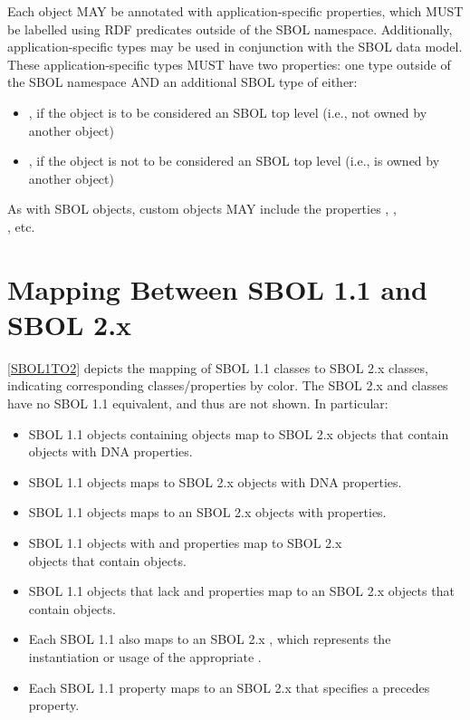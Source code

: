 Each  object MAY be annotated with application-specific properties, which MUST be labelled using RDF predicates outside of the SBOL namespace.  Additionally, application-specific types may be used in conjunction with the SBOL data model. These application-specific types MUST have two  properties: one type outside of the SBOL namespace AND an additional SBOL type of either:

\begin{itemize}
  \item {}, if the object is to be considered an SBOL top level (i.e., not owned by another object)
  \item {}, if the object is not to be considered an SBOL top level (i.e., is owned by another object)
\end{itemize}

As with SBOL  objects, custom  objects MAY include the properties , ,\\ , etc. 

\section{Mapping Between SBOL 1.1 and SBOL 2.x}
\label{sec:mapping}

\ref{SBOL1TO2} depicts the mapping of SBOL 1.1 classes to SBOL 2.x classes, indicating corresponding classes/properties by color.
The SBOL 2.x  and  classes have no SBOL 1.1 equivalent, and thus are not shown.
In particular:
\begin{itemize}
\item SBOL 1.1  objects containing  objects map to SBOL 2.x  objects that contain  objects with DNA  properties.
\item SBOL 1.1  objects maps to SBOL 2.x  objects with DNA  properties.
\item SBOL 1.1  objects maps to an SBOL 2.x  objects with   properties.
\item SBOL 1.1  objects with  and  properties map to SBOL 2.x\\
 objects that contain  objects.
\item SBOL 1.1  objects that lack  and  properties map to an SBOL 2.x  objects that contain  objects.
\item Each SBOL 1.1  also maps to an SBOL 2.x , which represents the instantiation or usage of the appropriate .
\item Each SBOL 1.1  property maps to an SBOL 2.x  that specifies a precedes  property.
\end{itemize}

